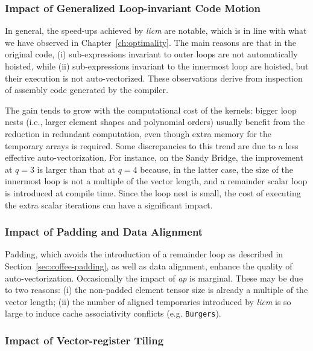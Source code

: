 \subsubsection{Impact of Generalized Loop-invariant Code Motion}
\label{sec:perf-eval-licm}

In general, the speed-ups achieved by \emph{licm} are notable, which is in line with what we have observed in Chapter~\ref{ch:optimality}. The main reasons are that in the original code, (i) sub-expressions invariant to outer loops are not automatically hoisted, while (ii) sub-expressions invariant to the innermost loop are hoisted, but their execution is not auto-vectorized. These observations derive from inspection of assembly code generated by the compiler. 

The gain tends to grow with the computational cost of the kernels: bigger loop nests (i.e., larger element shapes and polynomial orders) usually benefit from the reduction in redundant computation, even though extra memory for the temporary arrays is required. Some discrepancies to this trend are due to a less effective auto-vectorization. For instance, on the Sandy Bridge, the improvement at $q=3$ is larger than that at $q=4$ because, in the latter case, the size of the innermost loop is not a multiple of the vector length, and a remainder scalar loop is introduced at compile time. Since the loop nest is small, the cost of executing the extra scalar iterations can have a significant impact.

\subsubsection{Impact of Padding and Data Alignment}
\label{sec:perf-eval-padding}

Padding, which avoids the introduction of a remainder loop as described in Section~\ref{sec:coffee-padding}, as well as data alignment, enhance the quality of auto-vectorization. Occasionally the impact of \emph{ap} is marginal. These may be due to two reasons: (i) the non-padded element tensor size is already a multiple of the vector length; (ii) the number of aligned temporaries introduced by \emph{licm} is so large to induce cache associativity conflicts (e.g. {\tt Burgers}).

\subsubsection{Impact of Vector-register Tiling}
\label{sec:perf-eval-opvect}

